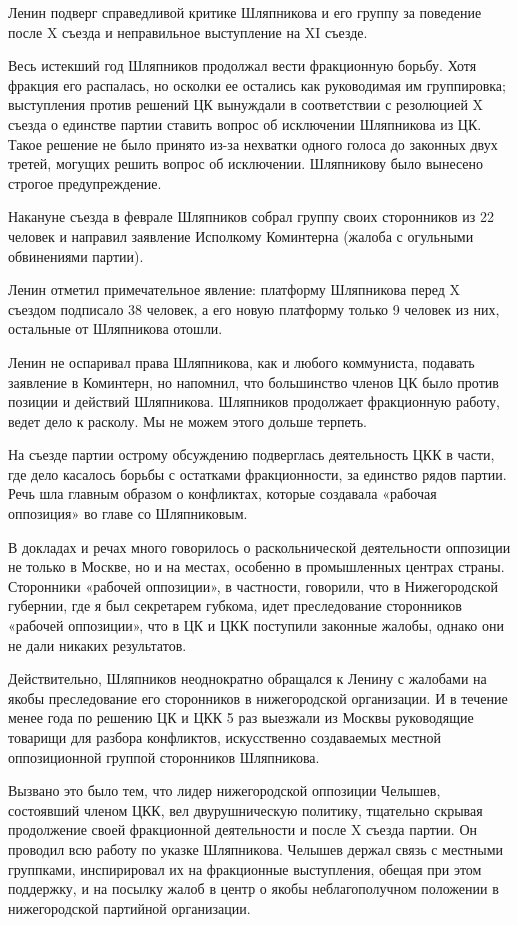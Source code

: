 \documentclass[12pt, a4paper, openany]{book}
\begin{document}
Ленин подверг справедливой критике Шляпникова и его группу за поведение после X съезда и неправильное выступление на XI съезде.

Весь истекший год Шляпников продолжал вести фракционную борьбу. Хотя фракция его распалась, но осколки ее остались как руководимая им группировка; выступления против решений ЦК вынуждали в соответствии с резолюцией X съезда о единстве партии ставить вопрос об исключении Шляпникова из ЦК. Такое решение не было принято из-за нехватки одного голоса до законных двух третей, могущих решить вопрос об исключении. Шляпникову было вынесено строгое предупреждение.

Накануне съезда в феврале Шляпников собрал группу своих сторонников из 22 человек и направил заявление Исполкому Коминтерна (жалоба с огульными обвинениями партии).

Ленин отметил примечательное явление: платформу Шляпникова перед X съездом подписало 38 человек, а его новую платформу только 9 человек из них, остальные от Шляпникова отошли.

Ленин не оспаривал права Шляпникова, как и любого коммуниста, подавать заявление в Коминтерн, но напомнил, что большинство членов ЦК было против позиции и действий Шляпникова. Шляпников продолжает фракционную работу, ведет дело к расколу. Мы не можем этого дольше терпеть.

На съезде партии острому обсуждению подверглась деятельность ЦКК в части, где дело касалось борьбы с остатками фракционности, за единство рядов партии. Речь шла главным образом о конфликтах, которые создавала «рабочая оппозиция» во главе со Шляпниковым.

В докладах и речах много говорилось о раскольнической деятельности оппозиции не только в Москве, но и на местах, особенно в промышленных центрах страны. Сторонники «рабочей оппозиции», в частности, говорили, что в Нижегородской губернии, где я был секретарем губкома, идет преследование сторонников «рабочей оппозиции», что в ЦК и ЦКК поступили законные жалобы, однако они не дали никаких результатов.

Действительно, Шляпников неоднократно обращался к Ленину с жалобами на якобы преследование его сторонников в нижегородской организации. И в течение менее года по решению ЦК и ЦКК 5 раз выезжали из Москвы руководящие товарищи для разбора конфликтов, искусственно создаваемых местной оппозиционной группой сторонников Шляпникова.

Вызвано это было тем, что лидер нижегородской оппозиции Челышев, состоявший членом ЦКК, вел двурушническую политику, тщательно скрывая продолжение своей фракционной деятельности и после X съезда партии. Он проводил всю работу по указке Шляпникова. Челышев держал связь с местными группками, инспирировал их на фракционные выступления, обещая при этом поддержку, и на посылку жалоб в центр о якобы неблагополучном положении в нижегородской партийной организации.
\end{document}
